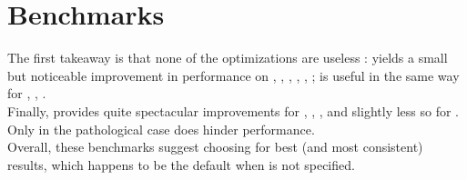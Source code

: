 \section{Benchmarks}

\begin{center}\label{bench-results}

\end{center}

The first takeaway is that none of the optimizations are useless :
 yields a small but noticeable improvement in performance on
, , , , , ;
 is useful in the same way for , , .\\
Finally,  provides quite spectacular improvements for ,
, ,  and slightly less so for .
Only in the pathological case  does  hinder performance.\\

Overall, these benchmarks suggest choosing  for best
(and most consistent) results, which happens to be the default when  is not
specified.\\

